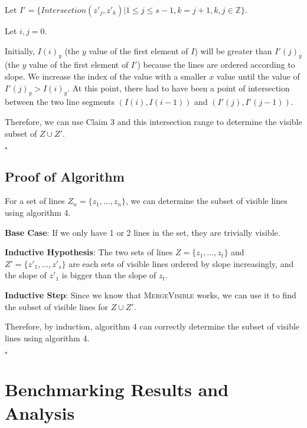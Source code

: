 \documentclass[12pt,letterpaper]{article}
\begin{document}
Let $I' = \{ Intersection(z'_j, z'_k) | 1 \leq j \leq s - 1, k = j + 1, k, j \in \mathbb{Z}  \}$.

Let $i,j = 0$.

Initially, $I(i)_y$ (the $y$ value of the first element of $I$) will be greater than $I'(j)_y$ (the $y$ value of the first element of $I'$) because the lines are ordered according to slope. We increase the index of the value with a smaller $x$ value until the value of $I'(j)_y > I(i)_y$. At this point, there had to have been a point of intersection between the two line segments $(I(i), I(i-1))$ and $(I'(j), I'(j-1))$. 

Therefore, we can use Claim 3 and this intersection range to determine the visible subset of $Z \cup Z'$.

$\square$

\subsection{Proof of Algorithm}

For a set of lines $Z_n = \{ z_1, ..., z_n \}$, we can determine the subset of visible lines using algorithm 4.

\textbf{Base Case}: If we only have 1 or 2 lines in the set, they are trivially visible.

\textbf{Inductive Hypothesis}: The two sets of lines $Z = \{ z_1, ..., z_t \}$ and $ Z' = \{ z'_1, ..., z'_s \}$ are each sets of visible lines ordered by slope increasingly, and the slope of $z'_1$ is bigger than the slope of $z_t$.

\textbf{Inductive Step}: Since we know that \textsc{MergeVisible} works, we can use it to find the subset of visible lines for $Z \cup Z'$.

Therefore, by induction, algorithm 4 can correctly determine the subset of visible lines using algorithm 4.

$\square$

\section{Benchmarking Results and Analysis}
\end{document}
